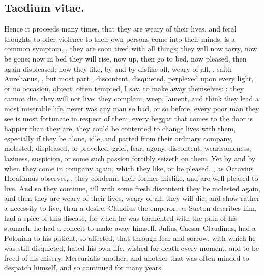 {\subsection{\textlatin{Taedium vitae}.}
Hence it proceeds many times, that they are weary of their lives, and feral
thoughts to offer violence to their own persons come into their minds,
 is a common symptom, ,
they are soon tired with all things; they will now tarry, now be gone; now in
bed they will rise, now up, then go to bed, now pleased, then again displeased;
now they like, by and by dislike all, weary of all, , saith Aurelianus, ,
but most part , discontent, disquieted,
perplexed upon every light, or no occasion, object: often tempted, I say, to
make away themselves: :
they cannot die, they will not live: they complain, weep, lament, and think
they lead a most miserable life, never was any man so bad, or so before, every
poor man they see is most fortunate in respect of them, every beggar that comes
to the door is happier than they are, they could be contented to change lives
with them, especially if they be alone, idle, and parted from their ordinary
company, molested, displeased, or provoked: grief, fear, agony, discontent,
wearisomeness, laziness, suspicion, or some such passion forcibly seizeth on
them. Yet by and by when they come in company again, which they like, or be
pleased, , as
Octavius Horatianus observes, , they
condemn their former mislike, and are well pleased to live. And so they
continue, till with some fresh discontent they be molested again, and then they
are weary of their lives, weary of all, they will die, and show rather a
necessity to live, than a desire. Claudius the emperor, as
Sueton describes him, had a spice of this disease, for
when he was tormented with the pain of his stomach, he had a conceit to make
away himself. Julius Caesar Claudinus,  had a
Polonian to his patient, so affected, that through fear
and sorrow, with which he was still disquieted, hated his own life, wished for
death every moment, and to be freed of his misery. Mercurialis another, and
another that was often minded to despatch himself, and so continued for many
years.

}
